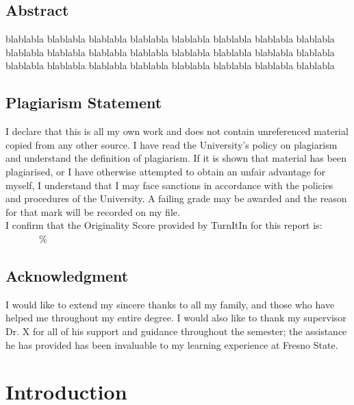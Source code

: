 \documentclass[12pt,onecolumn]{article}
\begin{document}
\newpage

\tableofcontents
\newpage
\listoffigures
\newpage
\listoftables
\newpage
\setcounter{page}{1}
\renewcommand{\thepage}{\arabic{page}}


\subsection*{Abstract}

blablabla blablabla blablabla blablabla blablabla blablabla
blablabla blablabla blablabla blablabla blablabla blablabla
blablabla blablabla blablabla blablabla blablabla blablabla
blablabla blablabla blablabla blablabla blablabla blablabla

\newpage

\subsection*{Plagiarism Statement}

I declare that this is all my own work and does not contain unreferenced material copied from any other source. I have read the University's policy on plagiarism and understand the definition of plagiarism. If it is shown that material has been plagiarised, or I have otherwise attempted to obtain an unfair advantage for myself, I understand that I may face sanctions in accordance with the policies and procedures of the University. A failing grade may be awarded and the reason for that mark will be recorded on my file.\\

I confirm that the Originality Score provided by TurnItIn for this report is: ~~~~~~~\%\\

\subsection*{Acknowledgment}

I would like to extend my sincere thanks to all my family, and those who have helped me throughout my entire degree. 
I would also like to thank my supervisor Dr. X for all of his support and guidance throughout the semester; the assistance he has provided has been invaluable to my learning experience at Fresno State.

\newpage
\section{Introduction}
\end{document}
